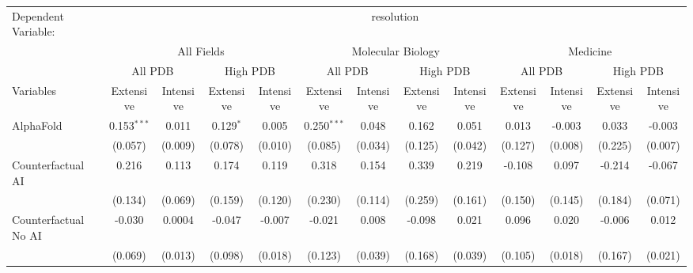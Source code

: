 \begingroup
\centering
\begin{tabular}{lcccccccccccc}
   \tabularnewline \midrule \midrule
   Dependent Variable: & \multicolumn{12}{c}{resolution}\\
 & \multicolumn{4}{c}{All Fields} & \multicolumn{4}{c}{Molecular Biology} & \multicolumn{4}{c}{Medicine} \\
\cmidrule(lr){2-5} \cmidrule(lr){6-9} \cmidrule(lr){10-13}
 & \multicolumn{2}{c}{All PDB} & \multicolumn{2}{c}{High PDB} & \multicolumn{2}{c}{All PDB} & \multicolumn{2}{c}{High PDB} & \multicolumn{2}{c}{All PDB} & \multicolumn{2}{c}{High PDB} \\
\cmidrule(lr){2-3} \cmidrule(lr){4-5} \cmidrule(lr){6-7} \cmidrule(lr){8-9} \cmidrule(lr){10-11} \cmidrule(lr){12-13}
Variables & \multicolumn{1}{c}{Extensive} & \multicolumn{1}{c}{Intensive} & \multicolumn{1}{c}{Extensive} & \multicolumn{1}{c}{Intensive} & \multicolumn{1}{c}{Extensive} & \multicolumn{1}{c}{Intensive} & \multicolumn{1}{c}{Extensive} & \multicolumn{1}{c}{Intensive} & \multicolumn{1}{c}{Extensive} & \multicolumn{1}{c}{Intensive} & \multicolumn{1}{c}{Extensive} & \multicolumn{1}{c}{Intensive} \\
\cmidrule(lr){1-1}\cmidrule(lr){2-2} \cmidrule(lr){3-3} \cmidrule(lr){4-4} \cmidrule(lr){5-5} \cmidrule(lr){6-6} \cmidrule(lr){7-7} \cmidrule(lr){8-8} \cmidrule(lr){9-9} \cmidrule(lr){10-10} \cmidrule(lr){11-11} \cmidrule(lr){12-12} \cmidrule(lr){13-13}
   AlphaFold                                & 0.153$^{***}$ & 0.011   & 0.129$^{*}$ & 0.005   & 0.250$^{***}$ & 0.048   & 0.162   & 0.051   & 0.013   & -0.003  & 0.033   & -0.003\\   
                                            & (0.057)       & (0.009) & (0.078)     & (0.010) & (0.085)       & (0.034) & (0.125) & (0.042) & (0.127) & (0.008) & (0.225) & (0.007)\\   
   Counterfactual AI                        & 0.216         & 0.113   & 0.174       & 0.119   & 0.318         & 0.154   & 0.339   & 0.219   & -0.108  & 0.097   & -0.214  & -0.067\\   
                                            & (0.134)       & (0.069) & (0.159)     & (0.120) & (0.230)       & (0.114) & (0.259) & (0.161) & (0.150) & (0.145) & (0.184) & (0.071)\\   
   Counterfactual No AI                     & -0.030        & 0.0004  & -0.047      & -0.007  & -0.021        & 0.008   & -0.098  & 0.021   & 0.096   & 0.020   & -0.006  & 0.012\\   
                                            & (0.069)       & (0.013) & (0.098)     & (0.018) & (0.123)       & (0.039) & (0.168) & (0.039) & (0.105) & (0.018) & (0.167) & (0.021)\\   

\end{tabular}
